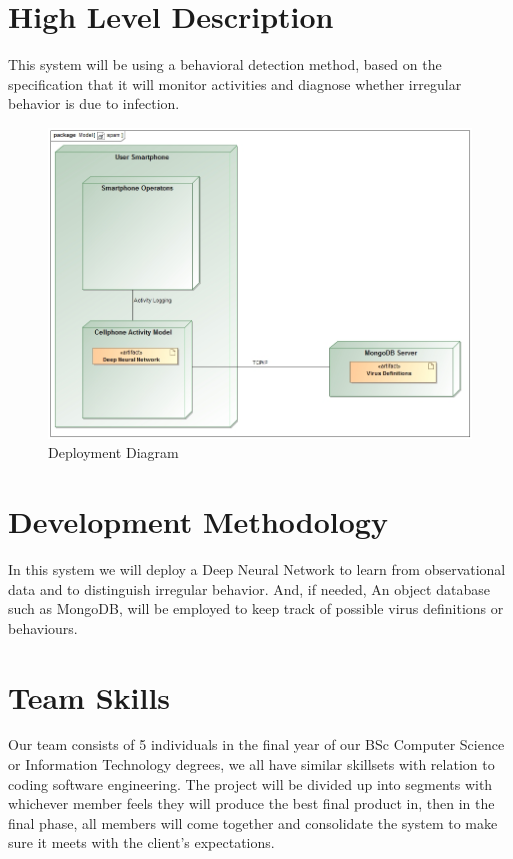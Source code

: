 \documentclass[12pt,a4paper]{article}
\begin{document}


\tableofcontents
\newpage

\section{High Level Description}
This system will be using a behavioral detection method, based on the specification that it will monitor activities and diagnose whether irregular behavior is due to infection.

\begin{figure}
    \includegraphics[width=\linewidth]{Images/spam.jpg}
    \caption{Deployment Diagram}
\end{figure}

\section{Development Methodology}
In this system we will deploy a Deep Neural Network to learn from observational data and to distinguish irregular behavior. And, if needed, An object database such as MongoDB, will be employed to keep track of possible virus definitions or behaviours.

\section{Team Skills}
Our team consists of 5 individuals in the final year of our BSc Computer Science or Information Technology degrees, we all have similar skillsets with relation to coding software engineering. The project will be divided up into segments with whichever member feels they will produce the best final product in, then in the final phase, all members will come together and consolidate the system to make sure it meets with the client's expectations.
\end{document}
